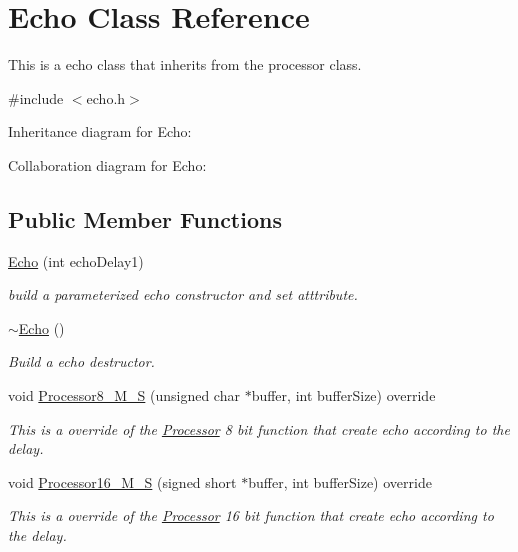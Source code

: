 \hypertarget{classEcho}{}\section{Echo Class Reference}
\label{classEcho}


This is a echo class that inherits from the processor class.  




{\ttfamily \#include $<$echo.\+h$>$}



Inheritance diagram for Echo\+:


Collaboration diagram for Echo\+:
\subsection*{Public Member Functions}
\begin{DoxyCompactItemize}
\item 
\mbox{\label{classEcho_af91611b596b84b017898ed20cad89a4e}} 
\hyperlink{classEcho_af91611b596b84b017898ed20cad89a4e}{Echo} (int echo\+Delay1)
\begin{DoxyCompactList}\small\item\em build a parameterized echo constructor and set atttribute. \end{DoxyCompactList}\item 
\mbox{\label{classEcho_a03c51e9ff426744f7ae68a9aac8614c8}} 
\hyperlink{classEcho_a03c51e9ff426744f7ae68a9aac8614c8}{$\sim$\+Echo} ()
\begin{DoxyCompactList}\small\item\em Build a echo destructor. \end{DoxyCompactList}\item 
void \hyperlink{classEcho_af4337545ebf5602337e605376bfa8dc3}{Processor8\+\_\+\+M\+\_\+S} (unsigned char $\ast$buffer, int buffer\+Size) override
\begin{DoxyCompactList}\small\item\em This is a override of the \hyperlink{classProcessor}{Processor} 8 bit function that create echo according to the delay. \end{DoxyCompactList}\item 
void \hyperlink{classEcho_ad68f1fabcbac2646c70aded5904b3a2c}{Processor16\+\_\+\+M\+\_\+S} (signed short $\ast$buffer, int buffer\+Size) override
\begin{DoxyCompactList}\small\item\em This is a override of the \hyperlink{classProcessor}{Processor} 16 bit function that create echo according to the delay. \end{DoxyCompactList}\end{DoxyCompactItemize}


